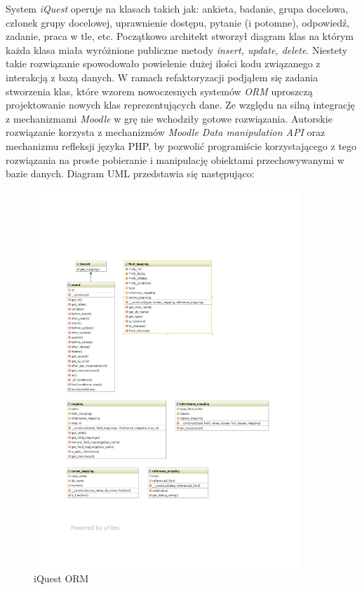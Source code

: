 System \emph{iQuest} operuje na klasach takich jak: ankieta, badanie, grupa docelowa, członek grupy docelowej, uprawnienie dostępu, pytanie (i potomne), odpowiedź, zadanie, praca w tle, etc. Początkowo architekt stworzył diagram klas na którym każda klasa miała wyróżnione publiczne metody \emph{insert, update, delete}. Niestety takie rozwiązanie spowodowało powielenie dużej ilości kodu związanego z interakcją z bazą danych. W ramach refaktoryzacji podjąłem się zadania stworzenia klas, które wzorem nowoczesnych systemów \emph{ORM} uproszczą projektowanie nowych klas reprezentujących dane. Ze względu na silną integrację z mechanizmami \emph{Moodle} w grę nie wchodziły gotowe rozwiązania. Autorskie rozwiązanie korzysta z mechanizmów \emph{Moodle Data manipulation API} oraz mechanizmu refleksji języka PHP, by pozwolić programiście korzystającego z tego rozwiązania na proste pobieranie i manipulację obiektami przechowywanymi w bazie danych. Diagram UML przedstawia się następująco:
\begin{figure}[H]
\begin{center}
\includegraphics[width=0.9\textwidth]{figures/lw/orm.pdf} 
\end{center}
\caption{iQuest ORM}
\label{fig:iquest-orm}
\end{figure}
